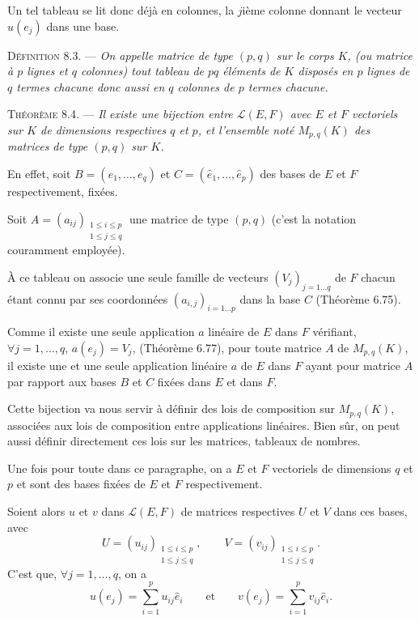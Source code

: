 Un tel tableau se lit donc déjà en colonnes, la $j$ième colonne donnant le vecteur $u(e_j)$ dans une base.

\medskip\noindent\textsc{Définition 8.3.} --- \emph{On appelle matrice de type $(p,q)$ sur le corps $K$, (ou matrice à $p$ lignes et $q$ colonnes) tout tableau de $pq$ éléments de $K$ disposés en $p$ lignes de $q$ termes chacune donc aussi en $q$ colonnes de $p$ termes chacune.}

\medskip\noindent\textsc{Théorème 8.4.} --- \emph{Il existe une bijection entre $\mathcal L(E,F)$ avec $E$ et $F$ vectoriels sur $K$ de dimensions respectives $q$ et $p$, et l'ensemble noté $M_{p,q}(K)$ des matrices de type $(p,q)$ sur $K$.}

En effet, soit $B=(e_1,\ldots,e_q)$ et $C=(\hat e_1,\ldots,\hat e_p)$ des bases de $E$ et $F$ respectivement, fixées.

Soit $A=(a_{ij})_{\substack{1\le i\le p\\1\le j\le q}}$ une matrice de type $(p,q)$ (c'est la notation couramment employée).

À ce tableau on associe une seule famille de vecteurs $(V_j)_{j=1\ldots q}$ de $F$ chacun étant connu par ses coordonnées $(a_{i,j})_{i=1\ldots p}$ dans la base $C$ (Théorème 6.75).

Comme il existe une seule application $a$ linéaire de $E$ dans $F$ vérifiant, $\forall j=1,\ldots,q$, $a(e_j)=V_j$, (Théorème 6.77), pour toute matrice $A$ de $M_{p,q}(K)$, il existe une et une seule application linéaire $a$ de $E$ dans $F$ ayant pour matrice $A$ par rapport aux bases $B$ et $C$ fixées dans $E$ et dans $F$. \bookend

Cette bijection va nous servir à définir des lois de composition sur $M_{p,q}(K)$, associées aux lois de composition entre applications linéaires. Bien sûr, on peut aussi définir directement ces lois sur les matrices, tableaux de nombres.

Une fois pour toute dans ce paragraphe, on a $E$ et $F$ vectoriels de dimensions $q$ et $p$ et  sont des bases fixées de $E$ et $F$ respectivement.

Soient alors $u$ et $v$ dans $\mathcal L(E,F)$ de matrices respectives $U$ et $V$ dans ces bases, avec
\[
U=(u_{ij})_{\substack{1\le i\le p\\1\le j\le q}},\qquad
V=(v_{ij})_{\substack{1\le i\le p\\1\le j\le q}}.
\]
C'est que, $\forall j=1,\ldots,q$, on a
\[
u(e_j)=\sum_{i=1}^p u_{ij}\hat e_i\qquad\text{et}\qquad
v(e_j)=\sum_{i=1}^p v_{ij}\hat e_i.
\]


